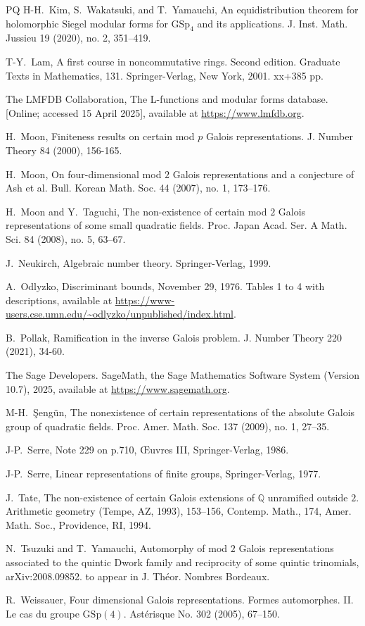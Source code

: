 \documentclass{amsart}
\theoremstyle{definition}
\newcommand{\Q}{\mathbb{Q}}
\newcommand{\GSp}{\mathrm{GSp}}
\begin{document}
\begin{thebibliography}{PQ}
  H-H.~Kim, S.~Wakatsuki, and T.~Yamauchi, An equidistribution theorem for holomorphic Siegel modular forms for $\GSp_4$ and its applications. J. Inst. Math. Jussieu 19 (2020), no. 2, 351–419.

  T-Y.~Lam, A first course in noncommutative rings. Second edition. Graduate Texts in Mathematics, 131. Springer-Verlag, New York, 2001. xx+385 pp.

  The LMFDB Collaboration, The L-functions and modular forms database. [Online; accessed 15 April 2025], available at \url{https://www.lmfdb.org}.

  H.~Moon, Finiteness results on certain mod $p$ Galois representations. J. Number Theory 84 (2000), 156-165.

  H.~Moon, On four-dimensional mod $2$ Galois representations and a conjecture of Ash et al. Bull. Korean Math. Soc. 44 (2007), no. 1, 173–176.

  H.~Moon and Y.~Taguchi, The non-existence of certain mod $2$ Galois representations of some small quadratic fields. Proc. Japan Acad. Ser. A Math. Sci. 84 (2008), no. 5, 63–67.

  J.~Neukirch, Algebraic number theory. Springer-Verlag, 1999.

  A.~Odlyzko, Discriminant bounds, November 29, 1976. Tables 1 to 4 with descriptions,
  available at \url{https://www-users.cse.umn.edu/~odlyzko/unpublished/index.html}.

  B.~Pollak, Ramification in the inverse Galois problem. J. Number Theory 220 (2021), 34-60.

  The Sage Developers. SageMath, the Sage Mathematics Software System (Version 10.7),
  2025, available at \url{https://www.sagemath.org}.

  M-H.~Şeng\"un,
  The nonexistence of certain representations of the absolute Galois group of quadratic fields.
  Proc. Amer. Math. Soc. 137 (2009), no. 1, 27–35.


  J-P.~Serre, Note 229 on p.710, \OE{}uvres III, Springer-Verlag, 1986.

  J-P.~Serre, Linear representations of finite groups, Springer-Verlag, 1977.

  J.~Tate, The non-existence of certain Galois extensions of $\Q$ unramified outside $2$. Arithmetic geometry (Tempe, AZ, 1993), 153–156, Contemp. Math., 174, Amer. Math. Soc., Providence, RI, 1994.

  N.~Tsuzuki and T.~Yamauchi, Automorphy of mod $2$ Galois representations associated to the quintic Dwork family and reciprocity of some quintic trinomials,
  arXiv:2008.09852. to appear in J. Th\'eor. Nombres Bordeaux.

  R.~Weissauer, Four dimensional Galois representations. Formes automorphes. II. Le cas du groupe $\GSp(4)$. Ast\'erisque No. 302 (2005), 67–150.



\end{thebibliography}
\end{document}
